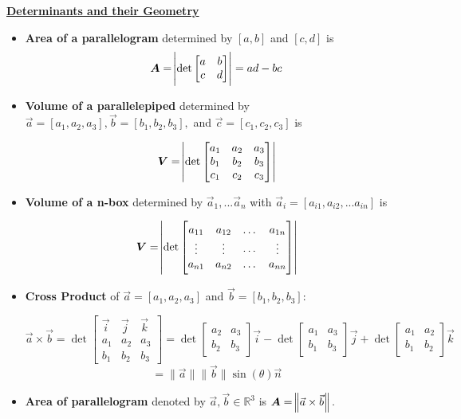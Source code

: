 \documentclass{article}
\begin{document}
\underline{\textbf{Determinants and their Geometry}} \\
\begin{itemize}
  \item \textbf{Area of a parallelogram} determined by $[a, b]$ and $[c, d]$ is
  \[\boldsymbol{A} = \abs{\det \begin{bmatrix}
    a & b \\
    c & d
  \end{bmatrix}} = ad - bc \]
  \item \textbf{Volume of a parallelepiped} determined by $\vec{a} = [a_1, a_2, a_3], \vec{b} = [b_1, b_2, b_3],$ and $\vec{c} = [c_1, c_2, c_3]$ is
  
    \[\boldsymbol{V} = \abs{\det \begin{bmatrix}
    a_1 & a_2 & a_3\\
    b_1 & b_2 & b_3\\
    c_1 & c_2 & c_3
  \end{bmatrix}} \]
  
  \item \textbf{Volume of a n-box} determined by $\vec{a}_1, ... \vec{a}_n$ with $\vec{a}_i = [a_{i1}, a_{i2}, ... a_{in}]$ is
  
    \[\boldsymbol{V} = \abs{\det \begin{bmatrix}
    a_{11} & a_{12} & \dots & a_{1n}\\
    \vdots & \vdots & \cdots & \vdots \\
    a_{n1} & a_{n2} & \dots & a_{nn}
  \end{bmatrix}} \]
  
  \item \textbf{Cross Product} of $\vec{a} = [a_1, a_2, a_3]$ and $\vec{b} = [b_1, b_2, b_3]:$ 
  
  \[\vec{a} \times \vec{b} = \det\begin{bmatrix}
  \vec{i} & \vec{j} & \vec{k} \\
  a_1 & a_2 & a_3 \\
  b_1 & b_2 & b_3
  \end{bmatrix} = \det\begin{bmatrix}
  a_2 & a_3 \\
  b_2 & b_3
  \end{bmatrix}\vec{i} - \det\begin{bmatrix}
  a_1 & a_3 \\
  b_1 & b_3
  \end{bmatrix}\vec{j} + \det\begin{bmatrix}
  a_1 & a_2 \\
  b_1 & b_2
  \end{bmatrix}\vec{k}\]
  \[
    = \big \|\vec{a}  \big \| \big \| \vec{b} \big \| \sin(\theta) \vec{n}
  \]
  
  \item \textbf{Area of parallelogram} denoted by $\vec{a}, \vec{b} \in \mathbb{R}^3$ is $\boldsymbol{A} = \norm{\vec{a} \times \vec{b}}.$\\

\end{itemize}
\end{document}
